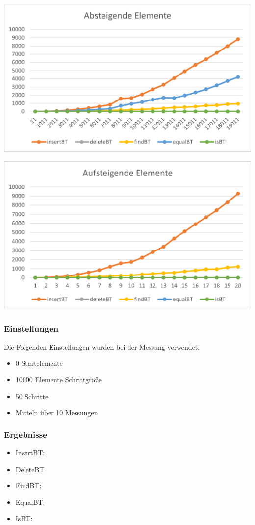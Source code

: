 \documentclass[11pt]{article}
\begin{document}
    \begin{center}
        \includegraphics[width=0.9\columnwidth] {ZeitAb.pdf}
    \end{center}
    \begin{center}
        \includegraphics[width=0.9\columnwidth] {ZeitAuf.pdf}
    \end{center}

    \subsubsection{Einstellungen}
    Die Folgenden Einstellungen wurden bei der Messung verwendet:
    \begin{itemize}
        \item 0 Startelemente
        \item 10000 Elemente Schrittgröße
        \item 50 Schritte
        \item Mitteln über 10 Messungen
    \end{itemize}

    \subsubsection{Ergebnisse}
    \begin{itemize}
        \item InsertBT:

        \item DeleteBT

        \item FindBT:

        \item EqualBT:

        \item IsBT:
    \end{itemize}
\end{document}
